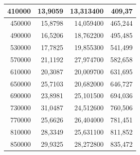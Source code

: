 \documentclass[a4paper, 12pt]{article}
\begin{document}
\begin{longtable}[c]{@{}rrrr@{}}
		\multicolumn{1}{|r|}{410000}                  & \multicolumn{1}{r|}{13,9059}           & \multicolumn{1}{r|}{13,313400}           & \multicolumn{1}{r|}{409,37}            \\* \midrule
		\multicolumn{1}{|r|}{450000}                  & \multicolumn{1}{r|}{15,8798}           & \multicolumn{1}{r|}{14,059400}           & \multicolumn{1}{r|}{465,244}           \\* \midrule
		\multicolumn{1}{|r|}{490000}                  & \multicolumn{1}{r|}{16,5206}           & \multicolumn{1}{r|}{18,762200}           & \multicolumn{1}{r|}{495,485}           \\* \midrule
		\multicolumn{1}{|r|}{530000}                  & \multicolumn{1}{r|}{17,7825}           & \multicolumn{1}{r|}{19,855300}           & \multicolumn{1}{r|}{541,499}           \\* \midrule
		\multicolumn{1}{|r|}{570000}                  & \multicolumn{1}{r|}{21,1192}           & \multicolumn{1}{r|}{27,974700}           & \multicolumn{1}{r|}{582,658}           \\* \midrule
		\multicolumn{1}{|r|}{610000}                  & \multicolumn{1}{r|}{20,3087}           & \multicolumn{1}{r|}{20,009700}           & \multicolumn{1}{r|}{631,695}           \\* \midrule
		\multicolumn{1}{|r|}{650000}                  & \multicolumn{1}{r|}{25,7103}           & \multicolumn{1}{r|}{20,682000}           & \multicolumn{1}{r|}{646,727}           \\* \midrule
		\multicolumn{1}{|r|}{690000}                  & \multicolumn{1}{r|}{23,8981}           & \multicolumn{1}{r|}{25,101500}           & \multicolumn{1}{r|}{694,036}           \\* \midrule
		\multicolumn{1}{|r|}{730000}                  & \multicolumn{1}{r|}{31,0487}           & \multicolumn{1}{r|}{24,512600}           & \multicolumn{1}{r|}{760,506}           \\* \midrule
		\multicolumn{1}{|r|}{770000}                  & \multicolumn{1}{r|}{25,6626}           & \multicolumn{1}{r|}{26,404000}           & \multicolumn{1}{r|}{781,451}           \\* \midrule
		\multicolumn{1}{|r|}{810000}                  & \multicolumn{1}{r|}{28,3349}           & \multicolumn{1}{r|}{25,631100}           & \multicolumn{1}{r|}{811,852}           \\* \midrule
		\multicolumn{1}{|r|}{850000}                  & \multicolumn{1}{r|}{29,9325}           & \multicolumn{1}{r|}{28,272800}           & \multicolumn{1}{r|}{835,472}           \\* \midrule

\end{longtable}
\end{document}
